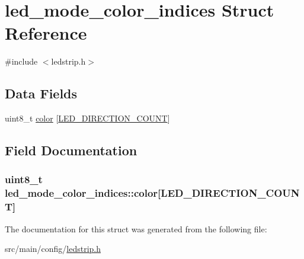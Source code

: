 \hypertarget{structled__mode__color__indices}{\section{led\+\_\+mode\+\_\+color\+\_\+indices Struct Reference}
\label{structled__mode__color__indices}
}


{\ttfamily \#include $<$ledstrip.\+h$>$}

\subsection*{Data Fields}
\begin{DoxyCompactItemize}
\item 
uint8\+\_\+t \hyperlink{structled__mode__color__indices_a2f4fef4b2e0ec6fa7e6be3c1d9d9e424}{color} \mbox{[}\hyperlink{config_2ledstrip_8h_a2d701d2f0fa9c14613f8cda8b1e78f0e}{L\+E\+D\+\_\+\+D\+I\+R\+E\+C\+T\+I\+O\+N\+\_\+\+C\+O\+U\+N\+T}\mbox{]}
\end{DoxyCompactItemize}


\subsection{Field Documentation}
\hypertarget{structled__mode__color__indices_a2f4fef4b2e0ec6fa7e6be3c1d9d9e424}{
\subsubsection[{color}]{\setlength{\rightskip}{0pt plus 5cm}uint8\+\_\+t led\+\_\+mode\+\_\+color\+\_\+indices\+::color\mbox{[}{\bf L\+E\+D\+\_\+\+D\+I\+R\+E\+C\+T\+I\+O\+N\+\_\+\+C\+O\+U\+N\+T}\mbox{]}}}\label{structled__mode__color__indices_a2f4fef4b2e0ec6fa7e6be3c1d9d9e424}


The documentation for this struct was generated from the following file\+:\begin{DoxyCompactItemize}
\item 
src/main/config/\hyperlink{config_2ledstrip_8h}{ledstrip.\+h}\end{DoxyCompactItemize}

